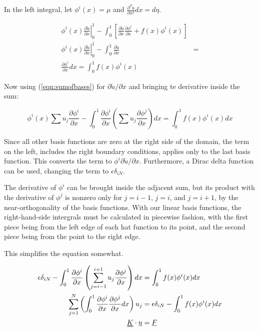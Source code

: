 \documentclass[10pt]{article}
\begin{document}
In the left integral, let $\phi^i(x)=\mu$ and $\frac{\partial^2\tilde{u}}{\partial x^2} dx=d\eta$.

\begin{equation}
    \begin{split}
        \phi^i(x) \left. \frac{\partial \tilde u}{\partial x} \right|_0^1 - \int_0^1 \left[\frac{\partial \tilde u}{\partial x} \frac{\partial \phi^i}{\partial x} + f(x) \phi^i(x)\right] \\
        \phi^i(x) \left. \frac{\partial \tilde u}{\partial x} \right|_0^1 - \int_0^1 \frac{\partial \tilde u}{\partial x} &= \\ \frac{\partial \phi^i}{\partial x} dx = \int_0^1 f(x) \phi^i(x)
    \end{split}
\end{equation}

Now using (\ref{eqn:sumofbases}) for $\partial \tilde u / \partial x$ and bringing te derivative inside the sum:
    
\begin{equation}
    \phi^i(x) \sum u_j \frac{\partial \phi^i}{\partial x} - \int_0^1 \frac{\partial \phi^i}{\partial x} \left( \sum u_j \frac{\partial \phi^j}{\partial x} \right) dx = \int_0^1 f(x) \phi^i(x) dx
\end{equation}

Since all other basis functions are zero at the right side of the domain, the term on the left, includes the right boundary conditions, applies only to the last basis function. This converts the term to $\phi^i \partial \tilde u / \partial x$. Furthermore, a Dirac delta function can be used, changing the term to $\epsilon \delta_{iN}$.

The derivative of $\phi^i$ can be brought inside the adjacent sum, but its product with the derivative of $\phi^j$ is nonzero only for $j=i-1$, $j=i$, and $j=i+1$, by the near-orthogonality of the basis functions. With our linear basis functions, the right-hand-side intergrals must be calculated in piecewise fashion, with the first piece being from the left edge of each hat function to its point, and the second piece being from the point to the right edge.

\pagebreak

This simplifies the equation somewhat.

\begin{equation}
    \label{eqn:tosolve-sum}
    \begin{split}
        \epsilon \delta_{iN} - \int_0^1 \frac{\partial \phi^i}{\partial x} \left( \sum_{j=i-1}^{i+1}u_j \frac{\partial \phi^j}{\partial x} \right) dx &= \int_0^1 f(x) \phi^i(x)dx \\
        \sum_{j=1}^{N} \left(
                \int_0^1 \frac{\partial \phi^i}{\partial x} \frac{\partial \phi^j}{\partial x} dx 
        \right) u_j &= \epsilon \delta_{iN} - \int_0^1 f(x)\phi^i(x)dx \\
        \uuline{K} \cdot \uline{u} &= \uline{F} 
    \end{split}
\end{equation}
\end{document}

